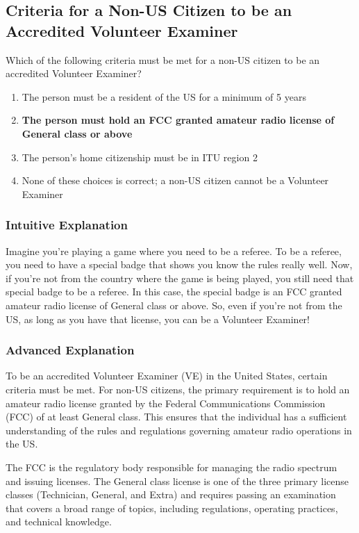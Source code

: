 \subsection{Criteria for a Non-US Citizen to be an Accredited Volunteer Examiner}
\label{G1D08}

\begin{tcolorbox}[colback=gray!10!white,colframe=black!75!black,title=G1D08]
Which of the following criteria must be met for a non-US citizen to be an accredited Volunteer Examiner?
\begin{enumerate}[label=\Alph*,noitemsep]
    \item The person must be a resident of the US for a minimum of 5 years
    \item \textbf{The person must hold an FCC granted amateur radio license of General class or above}
    \item The person’s home citizenship must be in ITU region 2
    \item None of these choices is correct; a non-US citizen cannot be a Volunteer Examiner
\end{enumerate}
\end{tcolorbox}

\subsubsection{Intuitive Explanation}
Imagine you're playing a game where you need to be a referee. To be a referee, you need to have a special badge that shows you know the rules really well. Now, if you're not from the country where the game is being played, you still need that special badge to be a referee. In this case, the special badge is an FCC granted amateur radio license of General class or above. So, even if you're not from the US, as long as you have that license, you can be a Volunteer Examiner!

\subsubsection{Advanced Explanation}
To be an accredited Volunteer Examiner (VE) in the United States, certain criteria must be met. For non-US citizens, the primary requirement is to hold an amateur radio license granted by the Federal Communications Commission (FCC) of at least General class. This ensures that the individual has a sufficient understanding of the rules and regulations governing amateur radio operations in the US.

The FCC is the regulatory body responsible for managing the radio spectrum and issuing licenses. The General class license is one of the three primary license classes (Technician, General, and Extra) and requires passing an examination that covers a broad range of topics, including regulations, operating practices, and technical knowledge.


